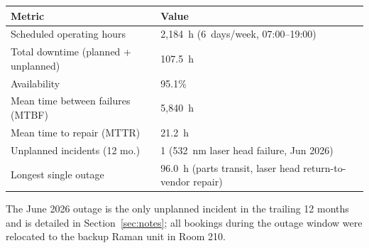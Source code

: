 \begin{center}
\renewcommand{\arraystretch}{1.12}
\begin{tabularx}{\linewidth}{@{}X l@{}}
\toprule
\rowcolor{slatePale}
\textbf{Metric} & \textbf{Value} \\
\midrule
Scheduled operating hours & 2{,}184~h (6~days/week, 07:00--19:00) \\
Total downtime (planned + unplanned) & 107.5~h \\
Availability & 95.1\% \\
Mean time between failures (MTBF) & 5{,}840~h \\
Mean time to repair (MTTR) & 21.2~h \\
Unplanned incidents (12 mo.) & 1 (532~nm laser head failure, Jun 2026) \\
Longest single outage & 96.0~h (parts transit, laser head return-to-vendor repair) \\
\bottomrule
\end{tabularx}
\end{center}

The June 2026 outage is the only unplanned incident in the trailing 12 months and is detailed in Section~\ref{sec:notes}; all bookings during the outage window were relocated to the backup Raman unit in Room 210.
